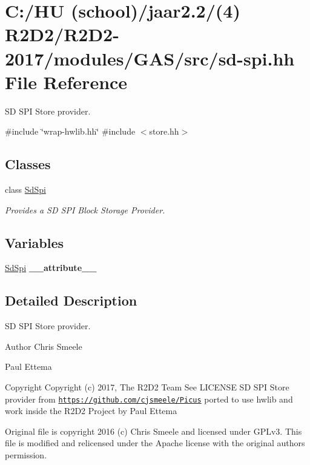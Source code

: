 \hypertarget{sd-spi_8hh}{}\section{C\+:/\+HU (school)/jaar2.2/(4) R2\+D2/\+R2\+D2-\/2017/modules/\+G\+A\+S/src/sd-\/spi.hh File Reference}
\label{sd-spi_8hh}


SD S\+PI Store provider.  


{\ttfamily \#include \char`\"{}wrap-\/hwlib.\+hh\char`\"{}}\newline
{\ttfamily \#include $<$store.\+hh$>$}\newline
\subsection*{Classes}
\begin{DoxyCompactItemize}
\item 
class \hyperlink{class_sd_spi}{Sd\+Spi}
\begin{DoxyCompactList}\small\item\em Provides a SD S\+PI Block Storage Provider. \end{DoxyCompactList}\end{DoxyCompactItemize}
\subsection*{Variables}
\begin{DoxyCompactItemize}
\item 
\mbox{\label{sd-spi_8hh_ac74ade0daa8170c6112d3540d621e598}} 
\hyperlink{class_sd_spi}{Sd\+Spi} {\bfseries \+\_\+\+\_\+attribute\+\_\+\+\_\+}
\end{DoxyCompactItemize}


\subsection{Detailed Description}
SD S\+PI Store provider. 

\begin{DoxyAuthor}{Author}
Chris Smeele 

Paul Ettema 
\end{DoxyAuthor}
\begin{DoxyCopyright}{Copyright}
Copyright (c) 2017, The R2\+D2 Team  See L\+I\+C\+E\+N\+SE SD S\+PI Store provider from \href{https://github.com/cjsmeele/Picus}{\tt https\+://github.\+com/cjsmeele/\+Picus} ported to use hwlib and work inside the R2\+D2 Project by Paul Ettema
\end{DoxyCopyright}
Original file is copyright 2016 (c) Chris Smeele and licensed under G\+P\+Lv3. This file is modified and relicensed under the Apache license with the original author\textquotesingle{}s permission. 